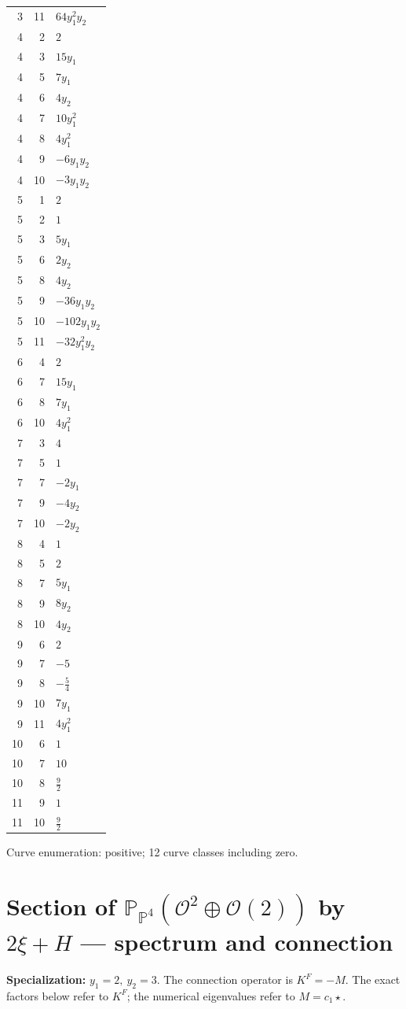 \documentclass[10pt,a4paper]{article}
\begin{document}
{\begin{longtable}{rrp{125mm}}
3 & 11 & $64 y_{1}^{2} y_{2}$\\
4 & 2 & $2$\\
4 & 3 & $15 y_{1}$\\
4 & 5 & $7 y_{1}$\\
4 & 6 & $4 y_{2}$\\
4 & 7 & $10 y_{1}^{2}$\\
4 & 8 & $4 y_{1}^{2}$\\
4 & 9 & $- 6 y_{1} y_{2}$\\
4 & 10 & $- 3 y_{1} y_{2}$\\
5 & 1 & $2$\\
5 & 2 & $1$\\
5 & 3 & $5 y_{1}$\\
5 & 6 & $2 y_{2}$\\
5 & 8 & $4 y_{2}$\\
5 & 9 & $- 36 y_{1} y_{2}$\\
5 & 10 & $- 102 y_{1} y_{2}$\\
5 & 11 & $- 32 y_{1}^{2} y_{2}$\\
6 & 4 & $2$\\
6 & 7 & $15 y_{1}$\\
6 & 8 & $7 y_{1}$\\
6 & 10 & $4 y_{1}^{2}$\\
7 & 3 & $4$\\
7 & 5 & $1$\\
7 & 7 & $- 2 y_{1}$\\
7 & 9 & $- 4 y_{2}$\\
7 & 10 & $- 2 y_{2}$\\
8 & 4 & $1$\\
8 & 5 & $2$\\
8 & 7 & $5 y_{1}$\\
8 & 9 & $8 y_{2}$\\
8 & 10 & $4 y_{2}$\\
9 & 6 & $2$\\
9 & 7 & $-5$\\
9 & 8 & $- \frac{5}{4}$\\
9 & 10 & $7 y_{1}$\\
9 & 11 & $4 y_{1}^{2}$\\
10 & 6 & $1$\\
10 & 7 & $10$\\
10 & 8 & $\frac{9}{2}$\\
11 & 9 & $1$\\
11 & 10 & $\frac{9}{2}$\\
\end{longtable}}
Curve enumeration: positive; 12 curve classes including zero.
\clearpage\section*{Section of $\mathbb P_{\mathbb P^{4}}(\mathcal O^{2}\oplus \mathcal O(2))$ by $2\xi +H$ --- spectrum and connection}
\textbf{Specialization:} $y_1=2,\ y_2=3$. The connection operator is $K^F=-M$. The exact factors below refer to $K^F$; the numerical eigenvalues refer to $M=c_1\star$.
\end{document}
